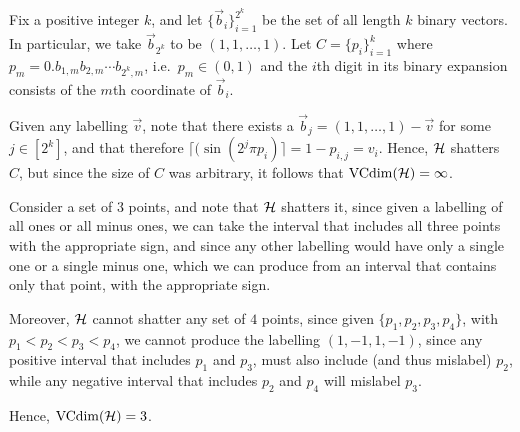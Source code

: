 \begin{ex}
  Fix a positive integer $k$, and let $\{\vec{b}_i\}_{i=1}^{2^k}$ be the set
  of all length $k$ binary vectors. In particular, we take $\vec{b}_{2^k}$ to be
  $(1,1,\ldots,1)$. Let $C=\{p_i\}_{i=1}^k$ where
  $p_m=0.b_{1,m}b_{2,m}\cdots b_{2^k,m}$, i.e.\ $p_m\in(0,1)$ and the
  $i$th digit in its binary expansion consists of the $m$th coordinate of
  $\vec{b}_i$.

  Given any labelling $\vec{v}$, note that there exists a
  $\vec{b}_j=(1,1,\ldots,1)-\vec{v}$ for some $j\in [2^k]$, and that therefore
  $\lceil(\sin(2^j\pi p_i) \rceil = 1 - p_{i,j}=v_i$. Hence, $\mathcal{H}$ shatters $C$,
  but since the size of $C$ was arbitrary, it follows that $\operatorname*{VCdim}(\mathcal{H})=\infty$.
\end{ex}

\begin{ex}
  Consider a set of $3$ points, and note that $\mathcal{H}$ shatters it, since given a
  labelling of all ones or all minus ones, we can take the interval that
  includes all three points with the appropriate sign, and since any other
  labelling would have only a single one or a single minus one, which we can
  produce from an interval that contains only that point, with the appropriate
  sign.

  Moreover, $\mathcal{H}$ cannot shatter any set of $4$ points, since given
  $\{p_1,p_2,p_3,p_4\}$, with $p_1<p_2<p_3<p_4$, we cannot produce the labelling
  $(1,-1,1,-1)$, since any positive interval that includes $p_1$ and $p_3$, must
  also include (and thus mislabel) $p_2$, while any negative interval that
  includes $p_2$ and $p_4$ will mislabel $p_3$.

  Hence, $\operatorname*{VCdim}(\mathcal{H})=3$.
\end{ex}

\begin{ex}
\end{ex}

\begin{ex}
\end{ex}

\begin{ex}
\end{ex}